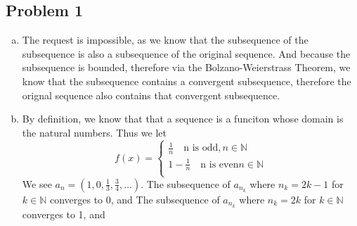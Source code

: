 \documentclass[12pt]{article}
\begin{document}
\subsection*{Problem 1}
\begin{enumerate}[a).]
    \item {
    The request is impossible, as we know that the subsequence of the subsequence is also a subsequence of the original sequence. 
    And because the subsequence is bounded, therefore via the Bolzano-Weierstrass Theorem, we know that the subsequence contains a convergent subsequence, therefore the orignal sequence also contains that convergent subsequence.
    }
    \item {
    By definition, we know that that a sequence is a funciton whose domain is the natural numbers.
    Thus we let 
        $$ 
        f(x) = \left\{ 
            \begin{array}{ll} 
                \frac{1}{n} \quad \text{n is odd}, n \in \mathbb{N}\\
                1 - \frac{1}{n} \quad \text{n is even} n \in \mathbb{N} \\
            \end{array} \right.
        $$
    We see $a_n = (1,0,\frac{1}{3}, \frac{3}{4}, \dots)$.
    The subsequence of $a_{n_k}$ where $n_k = 2k - 1$ for $k \in \mathbb{N}$ converges to 0, and 
    The subsequence of $a_{n_k}$ where $n_k = 2k $ for $k \in \mathbb{N}$ converges to 1, and 

    }
\end{enumerate}
\end{document}
